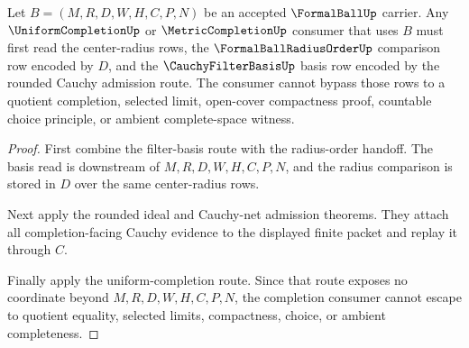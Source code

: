 \begin{theorem}
\label{thm:formalball-completion-basis-nonescape}
Let $B=(M,R,D,W,H,C,P,N)$ be an accepted $\FormalBallUp$ carrier. Any $\UniformCompletionUp$ or $\MetricCompletionUp$ consumer that uses $B$ must first read the center-radius rows, the $\FormalBallRadiusOrderUp$ comparison row encoded by $D$, and the $\CauchyFilterBasisUp$ basis row encoded by the rounded Cauchy admission route. The consumer cannot bypass those rows to a quotient completion, selected limit, open-cover compactness proof, countable choice principle, or ambient complete-space witness.
\end{theorem}
\begin{proof}
First combine the filter-basis route with the radius-order handoff. The basis read is downstream of $M,R,D,W,H,C,P,N$, and the radius comparison is stored in $D$ over the same center-radius rows.

Next apply the rounded ideal and Cauchy-net admission theorems. They attach all completion-facing Cauchy evidence to the displayed finite packet and replay it through $C$.

Finally apply the uniform-completion route. Since that route exposes no coordinate beyond $M,R,D,W,H,C,P,N$, the completion consumer cannot escape to quotient equality, selected limits, compactness, choice, or ambient completeness.
\end{proof}

